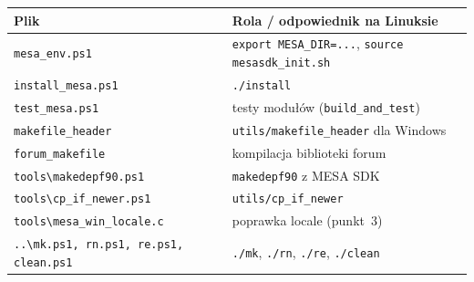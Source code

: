 \documentclass[11pt,a4paper]{article}
\begin{document}
\begin{center}
\begin{small}
\begin{tabular}{ll}
\toprule
\textbf{Plik} & \textbf{Rola / odpowiednik na Linuksie} \\
\midrule
\verb!mesa_env.ps1! & \verb!export MESA_DIR=...!, \verb!source mesasdk_init.sh! \\
\verb!install_mesa.ps1! & \verb!./install! \\
\verb!test_mesa.ps1! & testy modułów (\verb!build_and_test!) \\
\verb!makefile_header! & \verb!utils/makefile_header! dla Windows \\
\verb!forum_makefile! & kompilacja biblioteki forum \\
\verb!tools\makedepf90.ps1! & \verb!makedepf90! z MESA SDK \\
\verb!tools\cp_if_newer.ps1! & \verb!utils/cp_if_newer! \\
\verb!tools\mesa_win_locale.c! & poprawka locale (punkt~3) \\
\verb!..\mk.ps1, rn.ps1, re.ps1, clean.ps1! & \verb!./mk!, \verb!./rn!, \verb!./re!, \verb!./clean! \\
\bottomrule
\end{tabular}
\end{small}
\end{center}
\end{document}
